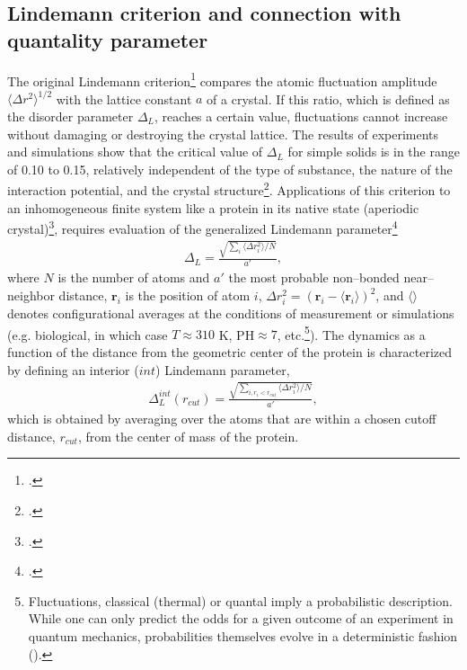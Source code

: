 \begin{subappendices}
\section[Lindemann criterion and  quantality parameter]{Lindemann criterion and connection with quantality parameter}\label{C2AppC}
The original Lindemann criterion\footnote{\cite{Lindemann:10}.} compares the atomic fluctuation amplitude $\langle\Delta r^2\rangle^{1/2}$ with the lattice constant $a$ of a crystal. If this ratio, which is defined as the disorder parameter $\Delta_L$, reaches a certain value, fluctuations cannot increase without damaging or destroying the crystal lattice. The results of experiments and simulations show that the critical value of $\Delta_L$ for simple solids is in the range of 0.10 to 0.15, relatively independent of the type of substance, the nature of the interaction potential, and the crystal structure\footnote{\cite{Bilgram:87,Lowen:94,Stillinger:95}.}. Applications of this criterion to an inhomogeneous finite system like a protein in its native state (aperiodic crystal)\footnote{\cite{Schrodinger:44}.}, requires evaluation of the generalized Lindemann parameter\footnote{\cite{Stillinger:90}.}
\begin{align}
\Delta_L=\frac{\sqrt{\sum_i\langle \Delta r_i^2\rangle/N}}{a'},
\end{align}  
where $N$ is the number of atoms and $a'$ the most probable non--bonded near--neighbor distance, $\mathbf r_i$ is the position of atom $i$, $\Delta r_i^2=(\mathbf r_i-\langle \mathbf r_i\rangle)^2$, and $\langle\rangle$ denotes configurational averages at the conditions of measurement or simulations (e.g. biological, in which case $T\approx 310$ K, PH$\approx 7$, etc.\footnote{Fluctuations, classical (thermal) or quantal imply a probabilistic description. While one can only predict the odds for a given outcome of an experiment in quantum mechanics, probabilities themselves evolve in a deterministic fashion  (\cite{Born:48}).}). The dynamics as a function of the distance from the geometric center of the protein is characterized by defining an interior ($int$) Lindemann parameter, 
\begin{align}
\Delta^{int}_L(r_{cut})=\frac{\sqrt{\sum_{i,r_i<r_{cut}}\langle \Delta r_i^2\rangle/N}}{a'},
\end{align}  
which is obtained by averaging over the atoms that are within a chosen cutoff distance, $r_{cut}$, from the center of mass of the protein.


\end{subappendices}
